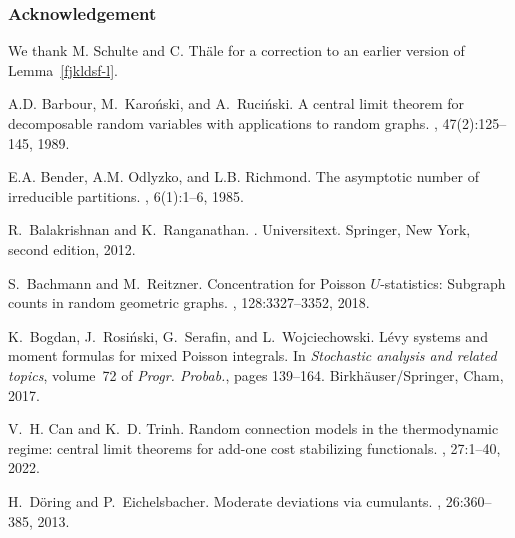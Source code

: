 \documentclass[12pt]{article}
\numberwithin{equation}{section}
\begin{document}
\subsubsection*{Acknowledgement}
\noindent
We thank M. Schulte and C. Th\"ale for a correction to an earlier
version of Lemma~\ref{fjkldsf-l}.

\footnotesize

\def\cprime{$'$} \def\polhk#1{\setbox0=\hbox{#1}{\ooalign{\hidewidth
  \lower1.5ex\hbox{`}\hidewidth\crcr\unhbox0}}}
  \def\polhk#1{\setbox0=\hbox{#1}{\ooalign{\hidewidth
  \lower1.5ex\hbox{`}\hidewidth\crcr\unhbox0}}} \def\cprime{$'$}
\begin{thebibliography}{BRSW17}

A.D. Barbour, M.~Karo{\'n}ski, and A.~Ruci{\'n}ski.
\newblock A central limit theorem for decomposable random variables with
  applications to random graphs.
, 47(2):125--145, 1989.

E.A. Bender, A.M. Odlyzko, and L.B. Richmond.
\newblock The asymptotic number of irreducible partitions.
, 6(1):1--6, 1985.

R.~Balakrishnan and K.~Ranganathan.
.
\newblock Universitext. Springer, New York, second edition, 2012.

S.~Bachmann and M.~Reitzner.
\newblock Concentration for {P}oisson {$U$}-statistics: {S}ubgraph counts in
  random geometric graphs.
, 128:3327--3352, 2018.

K.~Bogdan, J.~Rosi\'{n}ski, G.~Serafin, and L.~Wojciechowski.
\newblock L\'{e}vy systems and moment formulas for mixed {P}oisson integrals.
\newblock In {\em Stochastic analysis and related topics}, volume~72 of {\em
  Progr. Probab.}, pages 139--164. Birkh{\"{a}}user/Springer, Cham, 2017.

V.~H. Can and K.~D. Trinh.
\newblock Random connection models in the thermodynamic regime: central limit
  theorems for add-one cost stabilizing functionals.
, 27:1--40, 2022.

H.~D{\"{o}}ring and P.~Eichelsbacher.
\newblock Moderate deviations via cumulants.
, 26:360--385, 2013.


\end{thebibliography}
\end{document}
